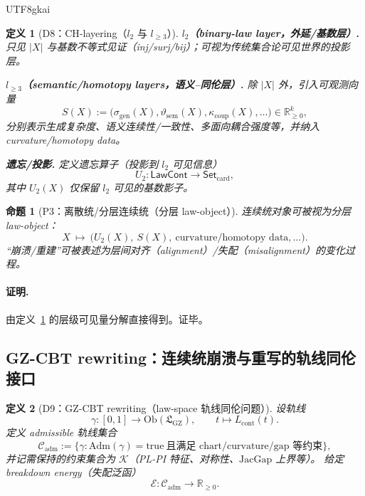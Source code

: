 \documentclass[12pt]{article}
\newtheorem{definition}{定义}[section]
\newtheorem{proposition}{命题}[section]
\begin{document}
\begin{CJK*}{UTF8}{gkai}
\begin{definition}[D8：CH-layering（$l_2$ 与 $l_{\ge 3}$）]
\label{def:tex19-appB-D8-layering}
\noindent\textbf{$l_2$（binary-law layer，外延/基数层）.}
只见 $|X|$ 与基数不等式见证（inj/surj/bij）；可视为传统集合论可见世界的投影层。

\par\noindent\textbf{$l_{\ge 3}$（semantic/homotopy layers，语义--同伦层）.}
除 $|X|$ 外，引入可观测向量
\[
S(X):=\bigl(\sigma_{\mathrm{gen}}(X),\vartheta_{\mathrm{sem}}(X),\kappa_{\mathrm{coup}}(X),\dots\bigr)\in \mathbb{R}
  _{\ge 0}^k,
\]
分别表示生成复杂度、语义连续性/一致性、多面向耦合强度等，并纳入 curvature/homotopy data。

\par\noindent\textbf{遗忘/投影.}
定义遗忘算子（投影到 $l_2$ 可见信息）
\[
U_2:\mathsf{LawCont}\to \mathsf{Set}_{\mathrm{card}},
\]
其中 $U_2(X)$ 仅保留 $l_2$ 可见的基数影子。
\end{definition}

\begin{proposition}[P3：离散统/分层连续统（分层 law-object）]
\label{prop:tex19-appB-P3-layered-continuum}
连续统对象可被视为分层 law-object：
\[
X\ \mapsto\ \bigl(U_2(X),\ S(X),\ \text{curvature/homotopy data},\dots\bigr).
\]
“崩溃/重建”可被表述为层间对齐（alignment）/失配（misalignment）的变化过程。
\end{proposition}

\paragraph{证明.}
由定义~\ref{def:tex19-appB-D8-layering} 的层级可见量分解直接得到。证毕。

\subsection{GZ-CBT rewriting：连续统崩溃与重写的轨线同伦接口}
\label{subsec:tex19-appB-gz-cbt}

\begin{definition}[D9：GZ-CBT rewriting（law-space 轨线同伦问题）]
\label{def:tex19-appB-D9-cbt}
设轨线
\[
\gamma:[0,1]\to \mathrm{Ob}(\mathfrak{L}_{\mathrm{GZ}}),\qquad t\mapsto L_{\mathrm{cont}}(t).
\]
定义 admissible 轨线集合
\[
\mathcal{C}_{\mathrm{adm}}:=\{\gamma:\mathrm{Adm}(\gamma)=\mathrm{true}\ \text{且满足 chart/curvature/gap 等约束}\},
\]
并记需保持的约束集合为 $\mathcal{K}$（PL-PI 特征、对称性、$\mathrm{JacGap}$ 上界等）。
给定 breakdown energy（失配泛函）
\[
\mathcal{E}:\mathcal{C}_{\mathrm{adm}}\to \mathbb{R}_{\ge 0}.
\]


\end{definition}
\end{CJK*}
\end{document}
